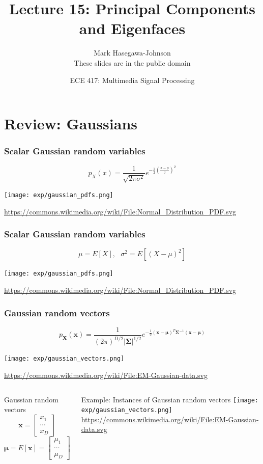 \documentclass{beamer}
\title{Lecture 15: Principal Components and Eigenfaces}
\author{Mark Hasegawa-Johnson\\These slides are in the public domain}
\date{ECE 417: Multimedia Signal Processing}
\begin{document}
\begin{frame}
  \maketitle
\end{frame}

\begin{frame}
  \tableofcontents
\end{frame}

\section[Review]{Review: Gaussians}
\setcounter{subsection}{1}

\begin{frame}
  \frametitle{Scalar Gaussian random variables}
  \[
  p_X(x) = \frac{1}{\sqrt{2\pi\sigma^2}}e^{-\frac{1}{2}\left(\frac{x-\mu}{\sigma}\right)^2}
  \]
  \centerline{\texttt{[image: exp/gaussian\_pdfs.png]}}
  {\footnotesize\url{https://commons.wikimedia.org/wiki/File:Normal_Distribution_PDF.svg}}
\end{frame}

\begin{frame}
  \frametitle{Scalar Gaussian random variables}
  \[
  \mu=E[X],~~~\sigma^2=E[(X-\mu)^2]
  \]
  \centerline{\texttt{[image: exp/gaussian\_pdfs.png]}}
  {\footnotesize\url{https://commons.wikimedia.org/wiki/File:Normal_Distribution_PDF.svg}}
\end{frame}

\begin{frame}
  \frametitle{Gaussian random vectors}
  \[
  p_{\mathbf{X}}(\mathbf{x})=\frac{1}{(2\pi)^{D/2}|\bm{\Sigma}|^{1/2}}e^{-\frac{1}{2}
    (\mathbf{x}-\bm{\mu})^T\bm{\Sigma}^{-1}(\mathbf{x}-\bm{\mu})}
  \]
  \centerline{\texttt{[image: exp/gaussian\_vectors.png]}}
  {\footnotesize\url{https://commons.wikimedia.org/wiki/File:EM-Gaussian-data.svg}}
\end{frame}

\begin{frame}
  \begin{columns}
    \column{2.125in}
    \begin{block}{Gaussian random vectors}
      \[
      \mathbf{x}=\left[\begin{array}{c}x_1\\\cdots\\x_{D}\end{array}\right]
      \]
      \[
      \bm{\mu}=E[\mathbf{x}]=\left[\begin{array}{c}\mu_1\\\cdots\\\mu_{D}\end{array}\right]
      \]
    \end{block}
    \column{2.125in}
    \begin{block}{Example: Instances of Gaussian random vectors}
      \texttt{[image: exp/gaussian\_vectors.png]}
      {\footnotesize\url{https://commons.wikimedia.org/wiki/File:EM-Gaussian-data.svg}}
    \end{block}
  \end{columns}
\end{frame}
\end{document}
